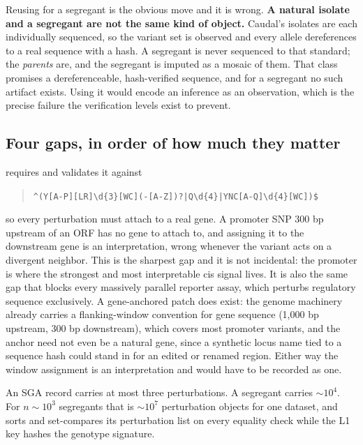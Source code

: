 Reusing  for a segregant is the obvious move and it is
wrong. \textbf{A natural isolate and a segregant are not the same kind of object.} Caudal's
isolates are each individually sequenced, so the variant set is observed and every allele
dereferences to a real sequence with a hash. A segregant is never sequenced to that
standard; the \emph{parents} are, and the segregant is imputed as a mosaic of them. That
class promises a dereferenceable, hash-verified sequence, and for a segregant no such
artifact exists. Using it would encode an inference as an observation, which is the precise
failure the verification levels exist to prevent.

\subsection{Four gaps, in order of how much they matter}

  requires
 and validates it against

\begin{quote}\small
\verb+^(Y[A-P][LR]\d{3}[WC](-[A-Z])?|Q\d{4}|YNC[A-Q]\d{4}[WC])$+
\end{quote}

so every perturbation must attach to a real gene. A promoter SNP 300 bp upstream of an ORF
has no gene to attach to, and assigning it to the downstream gene is an interpretation,
wrong whenever the variant acts on a divergent neighbor. This is the sharpest gap and it is
not incidental: the promoter is where the strongest and most interpretable cis signal lives.
It is also the same gap that blocks every massively parallel reporter assay, which perturbs
regulatory sequence exclusively. A gene-anchored patch does exist: the genome machinery
already carries a flanking-window convention for gene sequence (1,000 bp upstream, 300 bp
downstream), which covers most promoter variants, and the anchor need not even be a
natural gene, since a synthetic locus name tied to a sequence hash could stand in for an
edited or renamed region. Either way the window assignment is an interpretation and would
have to be recorded as one.

 An SGA record carries at most three perturbations. A segregant carries
$\sim\!10^4$. For $n \sim 10^3$ segregants that is $\sim\!10^7$ perturbation objects for one
dataset, and  sorts and set-compares its perturbation list on every equality
check while the L1 key hashes the genotype signature.

